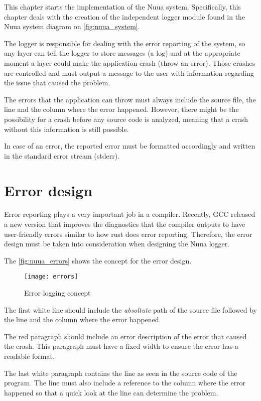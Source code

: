 This chapter starts the implementation of the Nuua system. Specifically, this chapter deals with the
creation of the independent logger module found in the Nuua system diagram on \autoref{fig:nuua_system}.

The logger is responsible for dealing with the error reporting of the system, so any layer can tell the logger
to store messages (a log) and at the appropriate moment a layer could make the application crash (throw an error). Those
crashes are controlled and must output a message to the user with information regarding the issue that caused the problem.

The errors that the application can throw must always include the source file, the line and the column where
the error happened. However, there might be the possibility for a crash before any source code is analyzed, meaning that a crash without
this information is still possible.

In case of an error, the reported error must be formatted accordingly and written in the standard error stream (stderr).

\section{Error design}

Error reporting plays a very important job in a compiler. Recently, GCC released a new version that improves the diagnostics
that the compiler outputs to have user-friendly errors similar to how rust does error reporting. Therefore, the error design must
be taken into consideration when designing the Nuua logger.

The \autoref{fig:nuua_errors} shows the concept for the error design.

\begin{figure}[H]
    \centering
    \texttt{[image: errors]}
    \caption{Error logging concept}
    \label{fig:nuua_errors}
\end{figure}

The first white line should include the \emph{absoltute} path of the source file followed by the line and the column where the error happened.

The red paragraph should include an error description of the error that caused the crash. This paragraph must have a fixed width to ensure
the error has a readable format.

The last white paragraph contains the line as seen in the source code of the program. The line must also include a reference to the column
where the error happened so that a quick look at the line can determine the problem.


